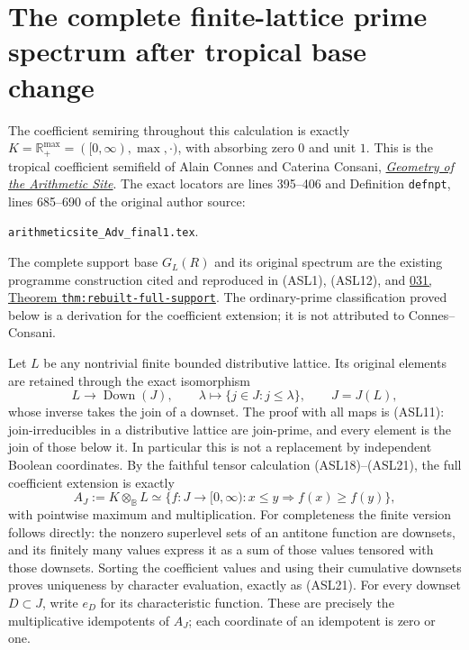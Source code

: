 \section{The complete finite-lattice prime spectrum after tropical base change}
\label{sec:tropical-lattice-prime-spectrum}

The coefficient semiring throughout this calculation is exactly
$K=\mathbb R_+^{\max}=([0,\infty),\max,\cdot)$, with absorbing
zero $0$ and unit $1$. This is the tropical coefficient semifield of
Alain Connes and Caterina Consani,
\href{https://arxiv.org/abs/1502.05580}{\emph{Geometry of the Arithmetic
Site}}. The exact locators are lines 395--406 and Definition
\texttt{defnpt}, lines 685--690 of the original author source:
\begin{center}
\texttt{arithmeticsite\_Adv\_final1.tex}.
\end{center}
The complete support base $G_L(R)$ and its original spectrum are the
existing programme construction cited and reproduced in (ASL1),
(ASL12), and
\href{https://github.com/KokunoYumeto/zeta-function-research-reader/blob/3c78cfbd9e194d35117b33277c421c6564ce3dbf/workbenches/splitzero-tandem/continuations/20260923-full-prime-support/031/01_REBUILT_MATHEMATICS.tex}{031,
Theorem \texttt{thm:rebuilt-full-support}}.
The ordinary-prime classification proved below is a derivation for
the coefficient extension; it is not attributed to Connes--Consani.

Let $L$ be any nontrivial finite bounded distributive lattice.
Its original elements are retained through the exact isomorphism
\begin{equation}\tag{LSP1}
 L\longrightarrow\operatorname{Down}(J),\qquad
 \lambda\longmapsto\{j\in J:j\le\lambda\},
 \qquad J=J(L),
\end{equation}
whose inverse takes the join of a downset. The proof with all maps
is (ASL11): join-irreducibles in a distributive lattice are join-prime,
and every element is the join of those below it. In particular this
is not a replacement by independent Boolean coordinates. By the
faithful tensor calculation (ASL18)--(ASL21), the full coefficient
extension is exactly
\begin{equation}\tag{LSP2}
 A_J:=K\otimes_{\mathbb B}L
 \simeq\{f:J\to[0,\infty):x\le y\Longrightarrow f(x)\ge f(y)\},
\end{equation}
with pointwise maximum and multiplication. For completeness the
finite version follows directly: the nonzero superlevel sets of
an antitone function are downsets, and its finitely many values
express it as a sum of those values tensored with those downsets.
Sorting the coefficient values and using their cumulative downsets
proves uniqueness by character evaluation, exactly as (ASL21).
For every downset $D\subset J$, write $e_D$ for its characteristic
function. These are precisely the multiplicative idempotents of
$A_J$; each coordinate of an idempotent is zero or one.

